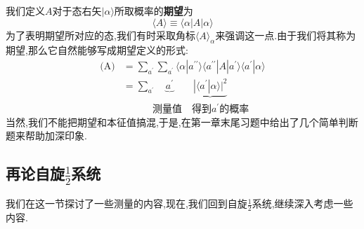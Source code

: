 \documentclass[lang=cn,newtx,10pt,scheme=chinese,thmcnt=section]{elegantbook}
\begin{document}
我们定义$A$对于态右矢$|\alpha\rangle$所取概率的\textbf{期望}为
\begin{equation}
	\langle A\rangle\equiv\langle\alpha| A|\alpha\rangle 
\end{equation}
为了表明期望所对应的态,我们有时采取角标$\langle A\rangle_{\alpha}$来强调这一点.由于我们将其称为期望,那么它自然能够写成期望定义的形式:
\begin{equation}
	\begin{aligned}
		\text{(A)}& = \sum_{a^{\prime}} \sum_{a^{\prime}} \langle\alpha | a^{\prime\prime}\rangle \langle a^{\prime\prime} | A | a^{\prime} \rangle \langle a^{\prime} | \alpha\rangle  \\
		&=\sum_{a^{\prime}}\quad \underbrace{a^{\prime}}\qquad\underbrace{|\langle a^{\prime}|\alpha\rangle|^{2}} \\
		&\qquad\quad\text{测量值}\quad\text{得到}a^{\prime}\text{的概率}
	\end{aligned}
\end{equation}
当然,我们不能把期望和本征值搞混,于是,在第一章末尾习题中给出了几个简单判断题来帮助加深印象.
\subsection*{再论自旋$\frac12$系统}
我们在这一节探讨了一些测量的内容,现在,我们回到自旋$\frac12$系统,继续深入考虑一些内容.
\end{document}
